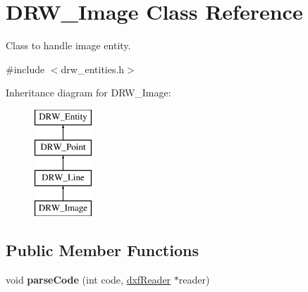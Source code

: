 \hypertarget{classDRW__Image}{\section{D\-R\-W\-\_\-\-Image Class Reference}
\label{classDRW__Image}
}


Class to handle image entity.  




{\ttfamily \#include $<$drw\-\_\-entities.\-h$>$}

Inheritance diagram for D\-R\-W\-\_\-\-Image\-:\begin{figure}[H]
\begin{center}
\leavevmode
\includegraphics[height=4.000000cm]{classDRW__Image}
\end{center}
\end{figure}
\subsection*{Public Member Functions}
\begin{DoxyCompactItemize}
\item 
\hypertarget{classDRW__Image_a570c35de31f0e518cbf72ead8713dd2c}{void {\bfseries parse\-Code} (int code, \hyperlink{classdxfReader}{dxf\-Reader} $\ast$reader)}\label{classDRW__Image_a570c35de31f0e518cbf72ead8713dd2c}

\end{DoxyCompactItemize}
